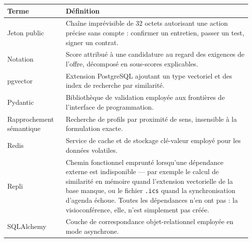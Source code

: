 \medskip
\noindent%
\begin{tabularx}{\textwidth}{L{3.4cm} X}
  \toprule
  \textbf{Terme} & \textbf{Définition} \\
  \midrule
  Jeton public & Chaîne imprévisible de 32 octets autorisant une action précise sans compte : confirmer un entretien, passer un test, signer un contrat. \\
  Notation     & Score attribué à une candidature au regard des exigences de l'offre, décomposé en sous-scores explicables. \\
  pgvector     & Extension PostgreSQL ajoutant un type vectoriel et des index de recherche par similarité. \\
  Pydantic     & Bibliothèque de validation employée aux frontières de l'interface de programmation. \\
  Rapprochement sémantique & Recherche de profils par proximité de sens, insensible à la formulation exacte. \\
  Redis        & Service de cache et de stockage clé-valeur employé pour les données volatiles. \\
  Repli        & Chemin fonctionnel emprunté lorsqu'une dépendance externe est indisponible — par exemple le calcul de similarité en mémoire quand l'extension vectorielle de la base manque, ou le fichier \texttt{.ics} quand la synchronisation d'agenda échoue. Toutes les dépendances n'en ont pas : la visioconférence, elle, n'est simplement pas créée. \\
  SQLAlchemy   & Couche de correspondance objet-relationnel employée en mode asynchrone. \\
  \bottomrule
\end{tabularx}

